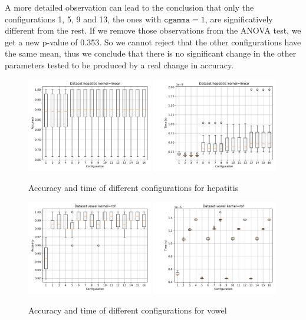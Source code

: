 \documentclass[a4paper]{article}
\begin{document}
A more detailed observation can lead to the conclusion that only the 
configurations 1, 5, 9 and 13, the ones with $\texttt{cgamma} = 1$, are 
significatively different from the rest.  If we remove those observations from 
the ANOVA test, we get a new p-value of 0.353.  So we cannot reject that the 
other configurations have the same mean, thus we conclude that there is no 
significant change in the other parameters tested to be produced by a real 
change in accuracy.
%
\begin{figure}[h]
	\centering
	\includegraphics[width=0.49\textwidth]{ex2/hepatitis.pdf}
	\includegraphics[width=0.49\textwidth]{ex2/hepatitis-time.pdf}
	\caption{Accuracy and time of different configurations for hepatitis}
	\label{fig:box-hepatitis}
\end{figure}
\begin{figure}[h]
	\centering
	\includegraphics[width=0.49\textwidth]{ex2/vowel.pdf}
	\includegraphics[width=0.49\textwidth]{ex2/vowel-time.pdf}
	\caption{Accuracy and time of different configurations for vowel}
	\label{fig:box-vowel}
\end{figure}
\end{document}
